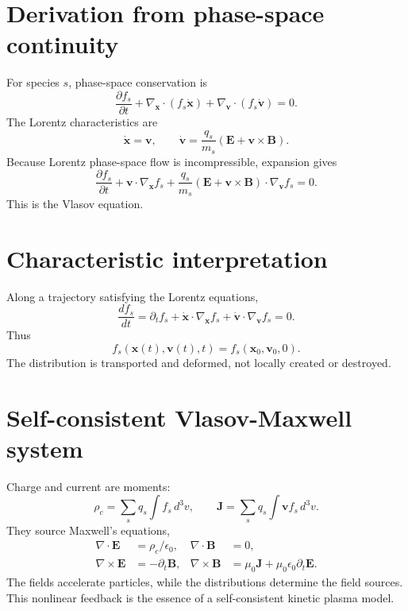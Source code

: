 \documentclass[11pt]{article}
\begin{document}
\section{Derivation from phase-space continuity}
For species $s$, phase-space conservation is
\begin{equation}
\frac{\partial f_s}{\partial t}
+\nabla_{\mathbf x}\cdot(f_s\dot{\mathbf x})
+\nabla_{\mathbf v}\cdot(f_s\dot{\mathbf v})=0.
\end{equation}
The Lorentz characteristics are
\begin{equation}
\dot{\mathbf x}=\mathbf v,
\qquad
\dot{\mathbf v}=\frac{q_s}{m_s}
(\mathbf E+\mathbf v\times\mathbf B).
\end{equation}
Because Lorentz phase-space flow is incompressible, expansion gives
\begin{equation}
\boxed{
\frac{\partial f_s}{\partial t}
+\mathbf v\cdot\nabla_{\mathbf x}f_s
+\frac{q_s}{m_s}(\mathbf E+\mathbf v\times\mathbf B)
\cdot\nabla_{\mathbf v}f_s=0.}
\end{equation}
This is the Vlasov equation.

\section{Characteristic interpretation}
Along a trajectory satisfying the Lorentz equations,
\begin{equation}
\frac{df_s}{dt}
=\partial_t f_s+\dot{\mathbf x}\cdot\nabla_{\mathbf x}f_s
+\dot{\mathbf v}\cdot\nabla_{\mathbf v}f_s=0.
\end{equation}
Thus
\begin{equation}
\boxed{f_s(\mathbf x(t),\mathbf v(t),t)=f_s(\mathbf x_0,\mathbf v_0,0)}.
\end{equation}
The distribution is transported and deformed, not locally created or destroyed.

\section{Self-consistent Vlasov-Maxwell system}
Charge and current are moments:
\begin{equation}
\rho_c=\sum_s q_s\int f_s\,d^3v,
\qquad
\mathbf J=\sum_s q_s\int\mathbf v f_s\,d^3v.
\end{equation}
They source Maxwell's equations,
\begin{align}
\nabla\cdot\mathbf E&=\rho_c/\epsilon_0, &
\nabla\cdot\mathbf B&=0,\\
\nabla\times\mathbf E&=-\partial_t\mathbf B, &
\nabla\times\mathbf B&=\mu_0\mathbf J+
\mu_0\epsilon_0\partial_t\mathbf E.
\end{align}
The fields accelerate particles, while the distributions determine the field sources. This nonlinear feedback is the essence of a self-consistent kinetic plasma model.
\end{document}
